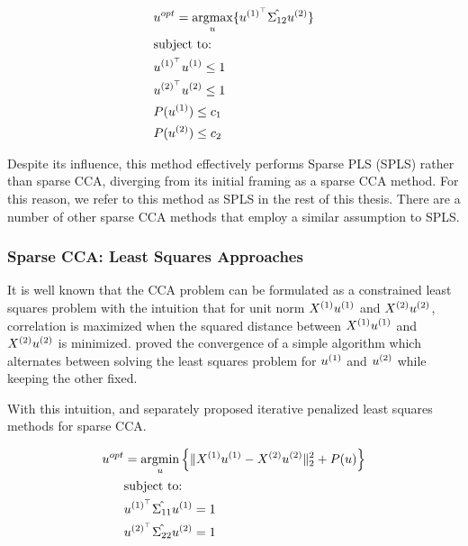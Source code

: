 \begin{align}
    & u^{opt}=\underset{u}{\mathrm{argmax}}\{ u^{(1)^{\top}} \hat{\Sigma_{12}} u^{(2)} \} \\
    & \text{subject to:} \notag \\
    & u^{(1)^{\top}} u^{(1)} \leq 1 \notag \\
    & u^{(2)^{\top}} u^{(2)} \leq 1 \notag \\
    & P(u^{(1)}) \leq c_1 \notag \\
    & P(u^{(2)}) \leq c_2 \notag
\end{align}

Despite its influence, this method effectively performs Sparse PLS (SPLS) rather than sparse CCA, diverging from its
initial framing as a sparse CCA method. For this reason, we refer to this method as SPLS in the rest of this thesis.
There are a number of other sparse CCA methods that employ a similar assumption to SPLS\cite{parkhomenko2009sparse}.

\subsubsection{Sparse CCA: Least Squares Approaches}

It is well known that the CCA problem can be formulated as a constrained least squares problem with the intuition that
for unit norm \(X^{(1)} u^{(1)}\) and \(X^{(2)} u^{(2)}\), correlation is maximized when the squared distance
between \(X^{(1)} u^{(1)}\) and \(X^{(2)} u^{(2)}\) is minimized. \cite{golub1995canonical} proved the
convergence of a simple algorithm which alternates between solving the least squares problem for \(u^{(1)}\) and
\(u^{(2)}\) while keeping the other fixed.

With this intuition, \cite{wilms2015sparse} and \cite{mai2019iterative} separately proposed iterative penalized least
squares methods for sparse CCA.

\begin{align}
    \label{eq:mai}
    u^{opt} &= \underset{u}{\mathrm{argmin}} \left\{ \|X^{(1)}u^{(1)} - X^{(2)}u^{(2)}\|_2^2 + P(u) \right\} \\
    &\text{subject to:} \notag \\
    &u^{(1)^{\top}} \hat{\Sigma_{11}} u^{(1)}=1 \notag \\
    &u^{(2)^{\top}} \hat{\Sigma_{22}} u^{(2)}=1 \notag
\end{align}

